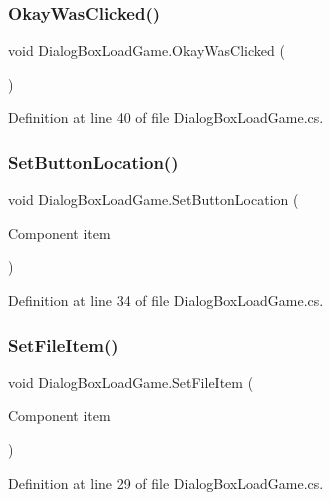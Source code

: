 \subsubsection{\texorpdfstring{Okay\+Was\+Clicked()}{OkayWasClicked()}}
{\footnotesize\ttfamily void Dialog\+Box\+Load\+Game.\+Okay\+Was\+Clicked (\begin{DoxyParamCaption}{ }\end{DoxyParamCaption})}



Definition at line 40 of file Dialog\+Box\+Load\+Game.\+cs.

\mbox{\label{class_dialog_box_load_game_a65c2977ff49232db0e18ea9f77bbb260}} 
\subsubsection{\texorpdfstring{Set\+Button\+Location()}{SetButtonLocation()}}
{\footnotesize\ttfamily void Dialog\+Box\+Load\+Game.\+Set\+Button\+Location (\begin{DoxyParamCaption}\item[{Component}]{item }\end{DoxyParamCaption})}



Definition at line 34 of file Dialog\+Box\+Load\+Game.\+cs.

\mbox{\label{class_dialog_box_load_game_a9a6dca217a606a303bb60cbc96c32e10}} 
\subsubsection{\texorpdfstring{Set\+File\+Item()}{SetFileItem()}}
{\footnotesize\ttfamily void Dialog\+Box\+Load\+Game.\+Set\+File\+Item (\begin{DoxyParamCaption}\item[{Component}]{item }\end{DoxyParamCaption})}



Definition at line 29 of file Dialog\+Box\+Load\+Game.\+cs.

